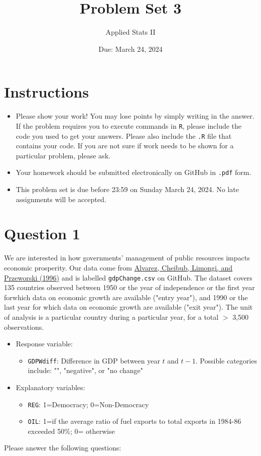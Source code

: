 \documentclass[12pt,letterpaper]{article}
\title{Problem Set 3}
\date{Due: March 24, 2024}
\author{Applied Stats II}
\begin{document}
	\maketitle
	\section*{Instructions}
	\begin{itemize}
	\item Please show your work! You may lose points by simply writing in the answer. If the problem requires you to execute commands in \texttt{R}, please include the code you used to get your answers. Please also include the \texttt{.R} file that contains your code. If you are not sure if work needs to be shown for a particular problem, please ask.
\item Your homework should be submitted electronically on GitHub in \texttt{.pdf} form.
\item This problem set is due before 23:59 on Sunday March 24, 2024. No late assignments will be accepted.
	\end{itemize}

	\vspace{.25cm}
\section*{Question 1}
\vspace{.25cm}
\noindent We are interested in how governments' management of public resources impacts economic prosperity. Our data come from \href{https://www.researchgate.net/profile/Adam_Przeworski/publication/240357392_Classifying_Political_Regimes/links/0deec532194849aefa000000/Classifying-Political-Regimes.pdf}{Alvarez, Cheibub, Limongi, and Przeworski (1996)} and is labelled \texttt{gdpChange.csv} on GitHub. The dataset covers 135 countries observed between 1950 or the year of independence or the first year forwhich data on economic growth are available ("entry year"), and 1990 or the last year for which data on economic growth are available ("exit year"). The unit of analysis is a particular country during a particular year, for a total $>$ 3,500 observations. 

\begin{itemize}
	\item
	Response variable: 
	\begin{itemize}
		\item \texttt{GDPWdiff}: Difference in GDP between year $t$ and $t-1$. Possible categories include: "", "negative", or "no change"
	\end{itemize}
	\item
	Explanatory variables: 
	\begin{itemize}
		\item
		\texttt{REG}: 1=Democracy; 0=Non-Democracy
		\item
		\texttt{OIL}: 1=if the average ratio of fuel exports to total exports in 1984-86 exceeded 50\%; 0= otherwise
	\end{itemize}
	
\end{itemize}
\newpage
\noindent Please answer the following questions:
\end{document}
